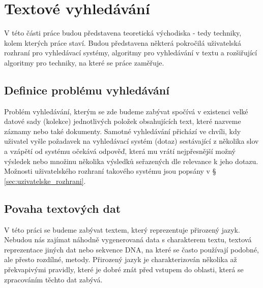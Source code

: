 \documentclass[11pt,letterpaper,oneside,openright]{book}
\begin{document}


\chapter{Textové vyhledávání}
V této části práce budou představena teoretická východiska - tedy techniky,
kolem kterých práce staví. Budou představena některá pokročilá uživatelská
rozhraní pro vyhledávací systémy, algoritmy pro vyhledávání v textu a
rozšiřující algoritmy pro techniky, na které se práce zaměřuje.

\section{Definice problému vyhledávání}
Problém vyhledávání, kterým se zde budeme zabývat spočívá v existenci velké
datové sady (kolekce) jednotlivých položek obsahujících text, které nazveme
záznamy nebo také dokumenty. Samotné vyhledávání přichází ve chvíli, kdy
uživatel vyšle požadavek na vyhledávací systém (dotaz) sestávající z několika
slov a vzápětí od systému očekává odpověď, která mu vrátí nejpřesnější možný
výsledek nebo množinu několika výsledků seřazených dle relevance k jeho dotazu.
Možnosti uživatelského rozhraní takového systému jsou popsány v
\S\,\ref{sec:uzivatelske_rozhrani}.

\section{Povaha textových dat}
V této práci se budeme zabývat textem, který reprezentuje přirozený jazyk.
Nebudou nás zajímat náhodně vygenerovaná data s charakterem textu, textová
reprezentace jiných dat nebo sekvence DNA, na které se často používají podobné,
ale přesto rozdílné, metody. Přirozený jazyk je charakterizován několika až
překvapivými pravidly, které je dobré znát před vstupem do oblasti, která se
zpracováním těchto dat zabývá.
\end{document}
